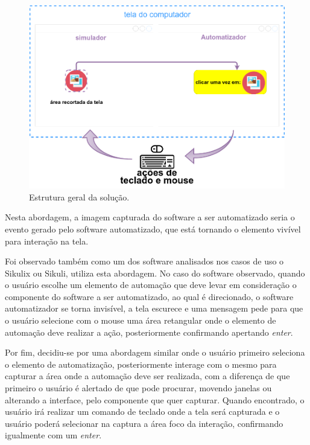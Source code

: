 \documentclass[tg]{mdtufsm}
\begin{document}
                \begin{figure}[!htb]
                    {\centering
                    \includegraphics[width=1.0\textwidth]{imagens/actionRecord}
                    \caption{Estrutura geral da solução.}
                    \label{fig:actionRecord}}
                \end{figure}

                Nesta abordagem, a imagem capturada do software a ser automatizado seria o evento gerado pelo software automatizado, que está tornando o elemento vivível para interação na tela.

                Foi observado também como um dos software analisados nos casos de uso o Sikulix ou Sikuli, utiliza esta abordagem. No caso do software observado, quando o usuário escolhe um elemento de automação que deve levar em consideração o componente do software a ser automatizado, ao qual é direcionado, o software automatizador se torna invisível, a tela escurece e uma mensagem pede para que o usuário selecione com o mouse uma área retangular onde o elemento de automação deve realizar a ação, posteriormente confirmando apertando \emph{enter}.

                Por fim, decidiu-se por uma abordagem similar onde o usuário primeiro seleciona o elemento de automatização, posteriormente interage com o mesmo para capturar a área onde a automação deve ser realizada, com a diferença de que primeiro o usuário é alertado de que pode procurar, movendo janelas ou alterando a interface, pelo componente que quer capturar. Quando encontrado, o usuário irá realizar um comando de teclado onde a tela será capturada e o usuário poderá selecionar na captura a área foco da interação, confirmando igualmente com um \emph{enter}.
\end{document}
